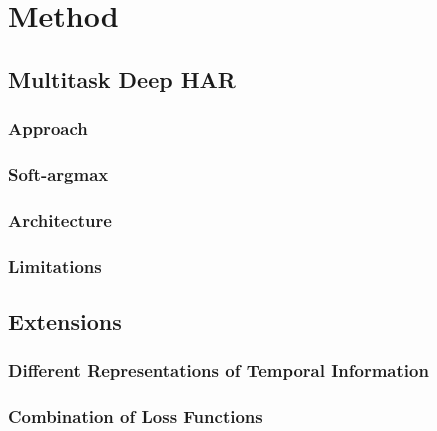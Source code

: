 \chapter{Method}
\section{Multitask Deep HAR}
\subsection{Approach}

\subsection{Soft-argmax}

\subsection{Architecture}

\subsection{Limitations}


\section{Extensions}

\subsection{Different Representations of Temporal Information}

\subsection{Combination of Loss Functions}